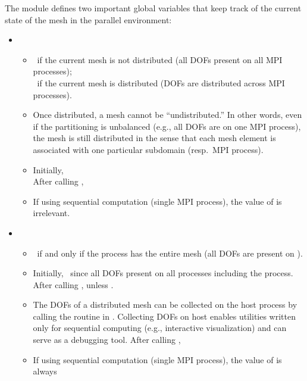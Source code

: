 The  module defines two important global variables that keep track of the current state of the mesh in the parallel environment:
\begin{itemize}
	\item {}
	\begin{itemize} \itemsep 2pt
		\item {}~if the current mesh is not distributed (all DOFs present on all MPI processes);\\
		~if the current mesh is distributed (DOFs are distributed across MPI processes).
		\item Once distributed, a mesh cannot be ``undistributed.'' In other words, even if the partitioning is unbalanced (e.g., all DOFs are on one MPI process), the mesh is still distributed in the sense that each mesh element is associated with one particular subdomain (resp.\ MPI process).
		\item Initially, \\
		After calling ,  
		\item If using sequential computation (single MPI process), the value of  is irrelevant.
	\end{itemize}
	\item {}
	\begin{itemize} \itemsep 2pt
	\item {}~if and only if the  process has the entire mesh (all DOFs are present on ).
	\item Initially, \ since all DOFs present on all processes including the  process. After calling ,  unless .
	\item The DOFs of a distributed mesh can be collected on the host process by calling the  routine in . Collecting DOFs on host enables utilities written only for sequential computing (e.g., interactive visualization) and can serve as a debugging tool. After calling , 
	\item If using sequential computation (single MPI process), the value of  is always 
	\end{itemize}
\end{itemize}

